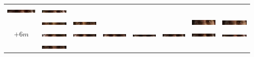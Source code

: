 \begin{tabular}{|c|c|c|c|c|c|c|c|}
\includegraphics[width=0.115\linewidth]{Auge1/A_Img7-6FalkoE.png} &
\includegraphics[width=0.115\linewidth]{Auge1/A_Img7-7FalkoE.png} \\&
\includegraphics[width=0.115\linewidth]{Auge1/A_Img7-1ThomasE.png} &
\includegraphics[width=0.115\linewidth]{Auge1/A_Img7-2ThomasE.png} &
&
&
&
\includegraphics[width=0.115\linewidth]{Auge1/A_Img7-6ThomasE.png} &
\includegraphics[width=0.115\linewidth]{Auge1/A_Img7-7ThomasE.png} \\\hline 
$+6m$&
\includegraphics[width=0.115\linewidth]{Auge1/A_Img6-1FalkoE.png} &
\includegraphics[width=0.115\linewidth]{Auge1/A_Img6-2FalkoE.png} &
\includegraphics[width=0.115\linewidth]{Auge1/A_Img6-3FalkoE.png} &
\includegraphics[width=0.115\linewidth]{Auge1/A_Img6-4FalkoE.png} &
\includegraphics[width=0.115\linewidth]{Auge1/A_Img6-5FalkoE.png} &
\includegraphics[width=0.115\linewidth]{Auge1/A_Img6-6FalkoE.png} &
\includegraphics[width=0.115\linewidth]{Auge1/A_Img6-7FalkoE.png} \\&
\includegraphics[width=0.115\linewidth]{Auge1/A_Img6-1ThomasE.png} &

\end{tabular}

